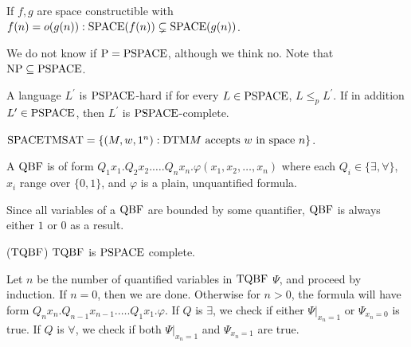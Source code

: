 \begin{note}
  If $f, g$ are space constructible with
  $f(n) = o(g(n)): \mathrm{SPACE}(f(n)) \subsetneq \mathrm{SPACE}(g(n))$.
\end{note}

\begin{note}
  We do not know if $\mathrm{P} = \mathrm{PSPACE}$, although we think no.
  Note that $\mathrm{NP} \subseteq \mathrm{PSPACE}$.
\end{note}

\begin{note}
  A language $L^\prime$ is $\mathrm{PSPACE}$-hard if for every $L \in \mathrm{PSPACE}$,
  $L \leq_p L^\prime$.
  If in addition $L^\prime \in \mathrm{PSPACE}$, then $L^\prime$ is
  $\mathrm{PSPACE}$-complete.
\end{note}

\begin{note}[$\SPACE \TMSAT$]
  $\mathrm{SPACE} \mathrm{TMSAT} = \left\{ (M, w, 1^n) :
    \text{$\mathrm{DTM} M$ accepts $w$ in space $n$} \right\}$.
\end{note}

\begin{note}
  A $\mathrm{QBF}$ is of form
  $Q_1 x_1 . Q_2 x_2 . \dots . Q_n x_n . \varphi (x_1, x_2, \dots, x_n)$
  where each $Q_i \in \{\exists, \forall \}$, $x_i$ range over $\{0, 1\}$,
  and $\varphi$ is a plain, unquantified formula.
\end{note}

\begin{note}
  Since all variables of a $\mathrm{QBF}$ are bounded by some quantifier, $\mathrm{QBF}$ is
  always either $1$ or $0$ as a result.
\end{note}

\begin{note}($\mathrm{TQBF}$)
  $\mathrm{TQBF}$ is $\mathrm{PSPACE}$ complete.
\end{note}

\begin{note}
  Let $n$ be the number of quantified variables in $\mathrm{TQBF}$ $\Psi$,
  and proceed by induction.
  If $n = 0$, then we are done.
  Otherwise for $n > 0$, the formula will have form
  $Q_n x_n . Q_{n - 1} x_{n - 1} . \dots . Q_1 x_1 . \varphi$.
  If $Q$ is $\exists$, we check if either $\Psi |_{x_n = 1}$ or
  $\Psi_{x_n = 0}$ is true.
  If $Q$ is $\forall$, we check if both $\Psi |_{x_n = 1}$ and
  $\Psi_{x_n = 1}$ are true.
\end{note}


